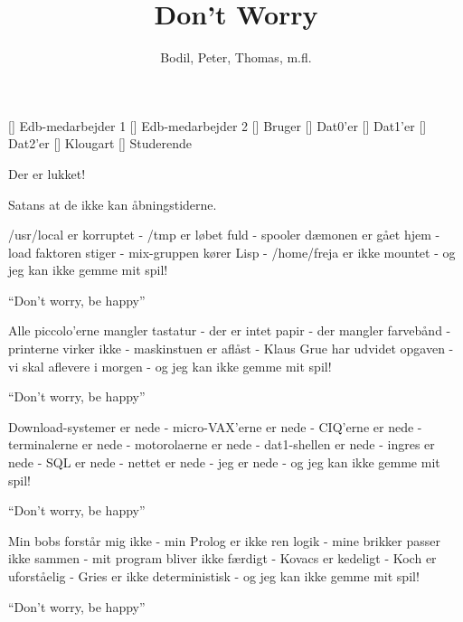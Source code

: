 \documentclass[a4paper,11pt]{article}
\title{Don't Worry}
\author{Bodil, Peter, Thomas, m.fl.}
\begin{document}
\maketitle

\begin{roles}
  [] Edb-medarbejder 1
  [] Edb-medarbejder 2
  [] Bruger
  [] Dat0'er
  [] Dat1'er
  [] Dat2'er
  [] Klougart
  [] Studerende
\end{roles}

\begin{song}

   Der er lukket! 

   Satans at de ikke kan åbningstiderne.

   /usr/local er korruptet - /tmp er løbet fuld - spooler dæmonen er gået hjem - load faktoren stiger - mix-gruppen kører Lisp - /home/freja er ikke mountet - og jeg kan ikke gemme mit spil!


  "`Don't worry, be happy"'


   Alle piccolo'erne mangler tastatur - der er intet papir -
  der mangler farvebånd - printerne virker ikke - maskinstuen er
  aflåst - Klaus Grue har udvidet opgaven - vi skal aflevere i
  morgen - og jeg kan ikke gemme mit spil!

  "`Don't worry, be happy"'

   Download-systemer er nede - micro-VAX'erne er nede -
  CIQ'erne er nede - terminalerne er nede - motorolaerne er nede -
  dat1-shellen er nede - ingres er nede - SQL er nede - nettet er
  nede - jeg er nede - og jeg kan ikke gemme mit spil!

  "`Don't worry, be happy"'

   Min bobs forstår mig ikke - min Prolog er ikke ren logik
  - mine brikker passer ikke sammen - mit program bliver ikke
  færdigt - Kovacs er kedeligt - Koch er uforståelig - Gries er ikke
  deterministisk - og jeg kan ikke gemme mit spil!

  "`Don't worry, be happy"'


\end{song}
\end{document}
